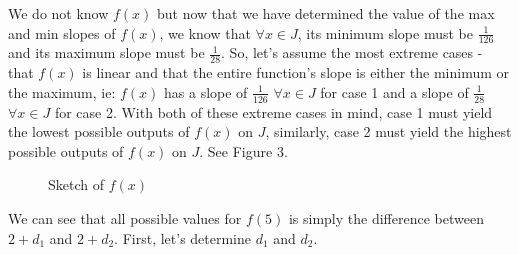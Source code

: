 \documentclass[12pt]{book}
\begin{document}
\begin{enumerate}
\begin{enumerate}
We do not know $f(x)$ but now that we have determined the value of the max and min slopes of $f(x)$, we know that $\forall x \in J$, its minimum slope must be $\frac{1}{126}$ and its maximum slope must be $\frac{1}{28}$. So, let's assume the most extreme cases - that $f(x)$ is linear and that the entire function's slope is either the minimum or the maximum, ie: $f(x)$ has a slope of $\frac{1}{126}$ $\forall x \in J$ for case 1 and a slope of $\frac{1}{28}$ $\forall x \in J$ for case 2. With both of these extreme cases in mind, case 1 must yield the lowest possible outputs of $f(x)$ on $J$, similarly, case 2 must yield the highest possible outputs of $f(x)$ on $J$. See Figure 3.

\begin{figure}[H] %
    \caption{Sketch of $f(x)$}
\end{figure}

We can see that all possible values for $f(5)$ is simply the difference between $2 + d_1$ and $2 + d_2$. First, let's determine $d_1$ and $d_2$.\\


\end{enumerate}
\end{enumerate}
\end{document}
